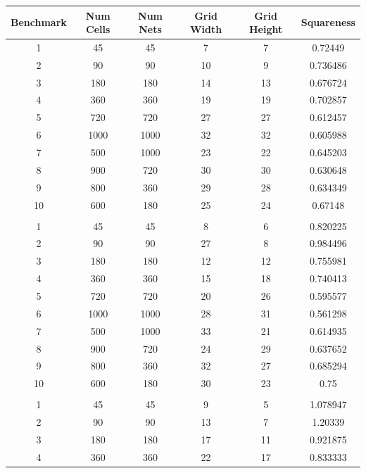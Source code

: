 \documentclass[10pt]{article}
\begin{document}
\begin{table}[H]
    \centering
    \begin{tabular}{cccccc}
        \toprule
        \textbf{Benchmark} & \textbf{Num Cells} & \textbf{Num Nets} & \textbf{Grid Width} & \textbf{Grid Height} & \textbf{Squareness}\\
        \midrule

        1  & 45   & 45   & 7  & 7  & 0.72449 \\
        2  & 90   & 90   & 10 & 9  & 0.736486 \\
        3  & 180  & 180  & 14 & 13 & 0.676724 \\
        4  & 360  & 360  & 19 & 19 & 0.702857 \\
        5  & 720  & 720  & 27 & 27 & 0.612457 \\
        6  & 1000 & 1000 & 32 & 32 & 0.605988 \\
        7  & 500  & 1000 & 23 & 22 & 0.645203 \\
        8  & 900  & 720  & 30 & 30 & 0.630648 \\
        9  & 800  & 360  & 29 & 28 & 0.634349 \\
        10 & 600  & 180  & 25 & 24 & 0.67148 \\
           &      &      &    &    & \\
        1  & 45   & 45   & 8  & 6  & 0.820225 \\
        2  & 90   & 90   & 27 & 8  & 0.984496 \\
        3  & 180  & 180  & 12 & 12 & 0.755981 \\
        4  & 360  & 360  & 15 & 18 & 0.740413 \\
        5  & 720  & 720  & 20 & 26 & 0.595577 \\
        6  & 1000 & 1000 & 28 & 31 & 0.561298 \\
        7  & 500  & 1000 & 33 & 21 & 0.614935 \\
        8  & 900  & 720  & 24 & 29 & 0.637652 \\
        9  & 800  & 360  & 32 & 27 & 0.685294 \\
        10 & 600  & 180  & 30 & 23 & 0.75 \\
           &      &      &    &    & \\
        1  & 45   & 45   & 9  & 5  & 1.078947 \\
        2  & 90   & 90   & 13 & 7  & 1.20339 \\
        3  & 180  & 180  & 17 & 11 & 0.921875 \\
        4  & 360  & 360  & 22 & 17 & 0.833333 \\

\end{tabular}
\end{table}
\end{document}
